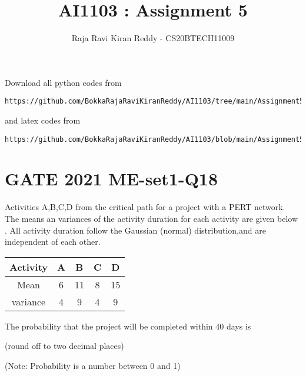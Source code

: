 \documentclass[journal,12pt,twocolumn]{IEEEtran}
\begin{document}
\let\vec\mathbf
\renewcommand{\thefigure}{\theproblem}
\def\putbox#1#2#3{\makebox[0in][l]{\makebox[#1][l]{}\raisebox{\baselineskip}[0in][0in]{\raisebox{#2}[0in][0in]{#3}}}}
     \def\rightbox#1{\makebox[0in][r]{#1}}
     \def\centbox#1{\makebox[0in]{#1}}
     \def\topbox#1{\raisebox{-\baselineskip}[0in][0in]{#1}}
     \def\midbox#1{\raisebox{-0.5\baselineskip}[0in][0in]{#1}}
\vspace{3cm}
\title{AI1103 : Assignment 5}
\author{Raja Ravi Kiran Reddy - CS20BTECH11009}
\maketitle
\newpage
\bigskip
\renewcommand{\thefigure}{\arabic{figure}}
\renewcommand{\thetable}{\arabic{table}}
Download all python codes from 
\begin{lstlisting}
https://github.com/BokkaRajaRaviKiranReddy/AI1103/tree/main/Assignment5/codes
\end{lstlisting}
%
and latex codes from 
%
\begin{lstlisting}
https://github.com/BokkaRajaRaviKiranReddy/AI1103/blob/main/Assignment5/Assignment5.tex
\end{lstlisting}
\section*{GATE 2021 ME-set1-Q18}
Activities A,B,C,D from the critical path for a project with a PERT network. The means an variances of the activity duration for each activity are given below . All activity duration follow the Gaussian (normal) distribution,and are independent of each other.

\begin{table}[h!]
\centering
\begin{tabular}{|c||c|c|c|c|}
    \hline
    Activity & A& B& C& D \\
    \hline
    Mean & 6& 11& 8& 15\\[1ex]
    \hline
    variance & 4& 9& 4& 9\\[1ex]
    \hline
\end{tabular}
\end{table}
The probability that the project will be completed within 40 days is  

(round off to two decimal places)

(Note: Probability is a number between 0 and 1)
\end{document}
